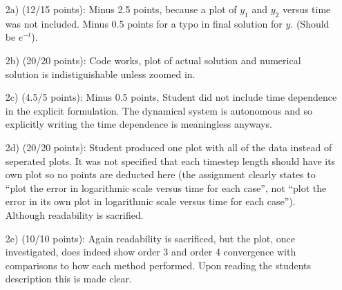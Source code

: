 \documentclass[10pt,english]{article}
\begin{document}
\begin{enumerate}
    \item [2a)] (12/15 points): Minus 2.5 points, because a plot of $y_1$ and $y_2$ versus time was not included. Minus 0.5 points for a typo in final solution for $y$. (Should be $e^{-t}$). 
\item [2b)] (20/20 points): Code works, plot of actual solution and numerical solution is indistiguishable unless zoomed in. 
\item [2c)] (4.5/5 points): Minus 0.5 points, Student did not include time dependence in the explicit formulation. The dynamical system is autonomous and so explicitly writing the time dependence is meaningless anyways. 
\item [2d)] (20/20 points): Student produced one plot with all of the data instead of seperated plots. It was not specified that each timestep length should have its own plot so no points are deducted here (the assignment clearly states to ``plot the error in logarithmic scale versus time for each case'', not ``plot the error in its own plot in logarithmic scale versus time for each case''). Although readability is sacrified. 
\item [2e)] (10/10 points): Again readability is sacrificed, but the plot, once investigated, does indeed show order 3 and order 4 convergence with comparisons to how each method performed. Upon reading the students description this is made clear. 
\end{enumerate}
\end{document}
